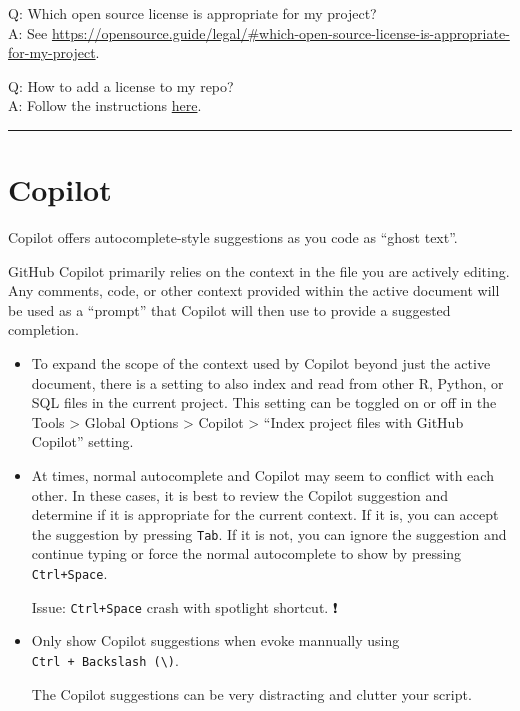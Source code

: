 \documentclass[
]{book}
\theoremstyle{definition}
\theoremstyle{definition}
\theoremstyle{definition}
\theoremstyle{definition}
\theoremstyle{remark}
\begin{document}
Q: Which open source license is appropriate for my project?\\
A: See \url{https://opensource.guide/legal/\#which-open-source-license-is-appropriate-for-my-project}.

Q: How to add a license to my repo?\\
A: Follow the instructions \href{https://docs.github.com/en/communities/setting-up-your-project-for-healthy-contributions/adding-a-license-to-a-repository}{here}.

\begin{center}\rule{0.5\linewidth}{0.5pt}\end{center}

\section{Copilot}\label{copilot}

Copilot offers autocomplete-style suggestions as you code as ``ghost text''.

GitHub Copilot primarily relies on the context in the file you are actively editing. Any comments, code, or other context provided within the active document will be used as a ``prompt'' that Copilot will then use to provide a suggested completion.

\begin{itemize}
\item
  To expand the scope of the context used by Copilot beyond just the active document, there is a setting to also index and read from other R, Python, or SQL files in the current project. This setting can be toggled on or off in the Tools \textgreater{} Global Options \textgreater{} Copilot \textgreater{} ``Index project files with GitHub Copilot'' setting.
\item
  At times, normal autocomplete and Copilot may seem to conflict with each other. In these cases, it is best to review the Copilot suggestion and determine if it is appropriate for the current context. If it is, you can accept the suggestion by pressing \texttt{Tab}. If it is not, you can ignore the suggestion and continue typing or force the normal autocomplete to show by pressing \texttt{Ctrl+Space}.

  Issue: \texttt{Ctrl+Space} crash with spotlight shortcut. ❗️
\item
  Only show Copilot suggestions when evoke mannually using \texttt{Ctrl\ +\ Backslash\ (\textbackslash{})}.

  The Copilot suggestions can be very distracting and clutter your script.
\end{itemize}
\end{document}
